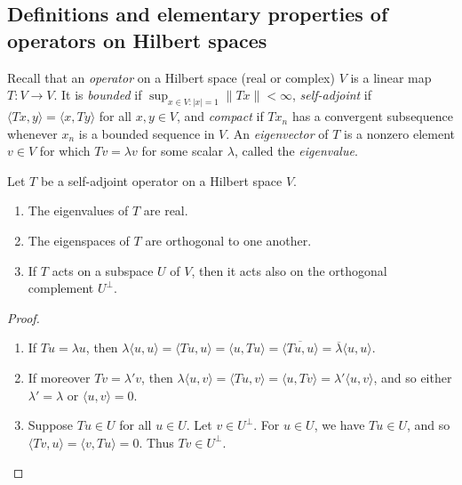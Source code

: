 \documentclass[reqno]{amsart} 
\begin{document}
\subsection{Definitions and elementary properties of operators on Hilbert spaces}
\label{sec:org3082d00}
\begin{definition}
  Recall that an \emph{operator} on a Hilbert space (real or complex)
  $V$ is a linear map $T : V \rightarrow V$.
  It is \emph{bounded} if $\sup_{x \in V : |x| = 1} \|T x\| <
  \infty$,
  \emph{self-adjoint}
  if $\langle T x, y \rangle = \langle x, T y \rangle$
  for all $x,y \in V$,
  and \emph{compact}
  if $T x_n$ has a convergent subsequence
  whenever $x_n$ is a bounded sequence in $V$.
  An \emph{eigenvector} of $T$ is a nonzero element $v \in V$
  for which $T v = \lambda v$ for some scalar $\lambda$,
  called the \emph{eigenvalue}.
\end{definition}
\begin{lemma}
  Let $T$ be a self-adjoint operator on a Hilbert space $V$.
  \begin{enumerate}
  \item The eigenvalues of $T$ are real.
  \item The eigenspaces of $T$  are orthogonal to
    one another.
  \item If $T$ acts on a subspace $U$ of $V$,
    then it acts also on the orthogonal complement $U^\perp$.
  \end{enumerate}
\end{lemma}
\begin{proof}
~
  \begin{enumerate}
  \item
    If $T u = \lambda u$,
    then
    $\lambda \langle u, u \rangle = \langle T u, u \rangle
    = \langle u, T u \rangle = \overline{\langle T u, u \rangle}
    = \overline{\lambda } \langle u, u \rangle$.
  \item 
    If moreover $T v = \lambda ' v$,
    then
    $\lambda \langle u,v \rangle = \langle  T u, v \rangle
    = \langle u, T v \rangle = \lambda ' \langle u,v \rangle$,
    and so either $\lambda ' = \lambda$
    or $\langle u,v \rangle = 0$.
  \item
    Suppose $T u \in U$ for all $u \in U$.
    Let $v \in U^\perp$.
    For $u \in U$,
    we have $T u \in U$,
    and so $\langle T v, u \rangle = \langle v, T u \rangle = 0$.
    Thus $T v \in U^\perp$.
  \end{enumerate}
\end{proof}
\end{document}
